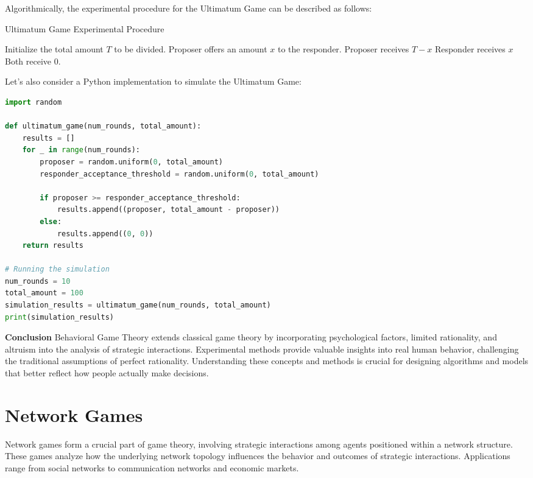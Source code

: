 \documentclass[12pt]{book} %
\begin{document}
Algorithmically, the experimental procedure for the Ultimatum Game can be described as follows:

\begin{algorithm}
\caption{Ultimatum Game Experimental Procedure}
\begin{algorithmic}[1]
\State Initialize the total amount \( T \) to be divided.
    \State Proposer offers an amount \( x \) to the responder.
        \State Proposer receives \( T - x \)
        \State Responder receives \( x \)
    \Else
        \State Both receive 0.
    \EndIf
\EndFor
\end{algorithmic}
\end{algorithm}

\FloatBarrier

Let's also consider a Python implementation to simulate the Ultimatum Game:
\FloatBarrier 
\begin{lstlisting}[language=Python, caption=Ultimatum Game Simulation]
import random

def ultimatum_game(num_rounds, total_amount):
    results = []
    for _ in range(num_rounds):
        proposer = random.uniform(0, total_amount)
        responder_acceptance_threshold = random.uniform(0, total_amount)
        
        if proposer >= responder_acceptance_threshold:
            results.append((proposer, total_amount - proposer))
        else:
            results.append((0, 0))
    return results

# Running the simulation
num_rounds = 10
total_amount = 100
simulation_results = ultimatum_game(num_rounds, total_amount)
print(simulation_results)
\end{lstlisting}

\FloatBarrier

\textbf{Conclusion}
Behavioral Game Theory extends classical game theory by incorporating psychological factors, limited rationality, and altruism into the analysis of strategic interactions. Experimental methods provide valuable insights into real human behavior, challenging the traditional assumptions of perfect rationality. Understanding these concepts and methods is crucial for designing algorithms and models that better reflect how people actually make decisions.


\section{Network Games}
Network games form a crucial part of game theory, involving strategic interactions among agents positioned within a network structure. These games analyze how the underlying network topology influences the behavior and outcomes of strategic interactions. Applications range from social networks to communication networks and economic markets.
\end{document}

